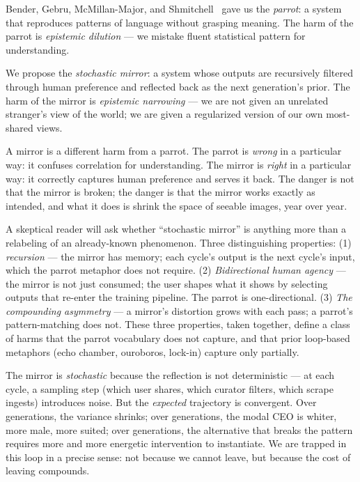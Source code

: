 \documentclass[sigconf,nonacm]{acmart}
\begin{document}
Bender, Gebru, McMillan-Major, and Shmitchell~\cite{bender2021dangers} gave us the \emph{parrot}: a system that reproduces patterns of language without grasping meaning. The harm of the parrot is \emph{epistemic dilution} --- we mistake fluent statistical pattern for understanding.

We propose the \emph{stochastic mirror}: a system whose outputs are recursively filtered through human preference and reflected back as the next generation's prior. The harm of the mirror is \emph{epistemic narrowing} --- we are not given an unrelated stranger's view of the world; we are given a regularized version of our own most-shared views.

A mirror is a different harm from a parrot. The parrot is \emph{wrong} in a particular way: it confuses correlation for understanding. The mirror is \emph{right} in a particular way: it correctly captures human preference and serves it back. The danger is not that the mirror is broken; the danger is that the mirror works exactly as intended, and what it does is shrink the space of seeable images, year over year.

A skeptical reader will ask whether ``stochastic mirror'' is anything more than a relabeling of an already-known phenomenon. Three distinguishing properties: (1) \emph{recursion} --- the mirror has memory; each cycle's output is the next cycle's input, which the parrot metaphor does not require. (2) \emph{Bidirectional human agency} --- the mirror is not just consumed; the user shapes what it shows by selecting outputs that re-enter the training pipeline. The parrot is one-directional. (3) \emph{The compounding asymmetry} --- a mirror's distortion grows with each pass; a parrot's pattern-matching does not. These three properties, taken together, define a class of harms that the parrot vocabulary does not capture, and that prior loop-based metaphors (echo chamber, ouroboros, lock-in) capture only partially.

The mirror is \emph{stochastic} because the reflection is not deterministic --- at each cycle, a sampling step (which user shares, which curator filters, which scrape ingests) introduces noise. But the \emph{expected} trajectory is convergent. Over generations, the variance shrinks; over generations, the modal CEO is whiter, more male, more suited; over generations, the alternative that breaks the pattern requires more and more energetic intervention to instantiate. We are trapped in this loop in a precise sense: not because we cannot leave, but because the cost of leaving compounds.
\end{document}
